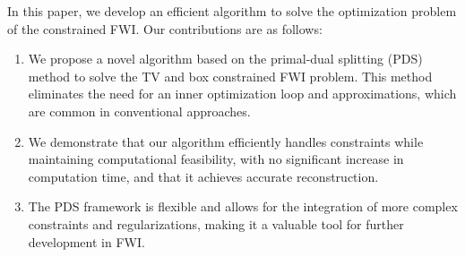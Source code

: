 In this paper, we develop an efficient algorithm to solve the optimization problem of the constrained FWI. Our contributions are as follows:
\begin{enumerate}
      \item We propose a novel algorithm based on the primal-dual splitting (PDS) method to solve the TV and box constrained FWI problem.
            This method eliminates the need for an inner optimization loop and approximations, which are common in conventional approaches.
      \item We demonstrate that our algorithm efficiently handles constraints while maintaining computational feasibility, with no significant increase in computation time, and that it achieves accurate reconstruction.
      \item The PDS framework is flexible and allows for the integration of more complex constraints and regularizations, making it a valuable tool for further development in FWI.
\end{enumerate}


